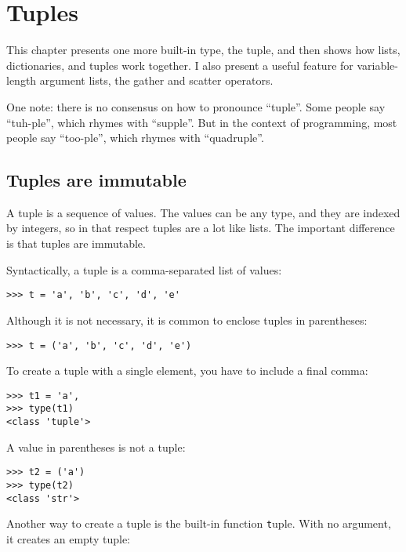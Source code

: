 \documentclass[
DIV=11,
fontsize=13,
twoside,
headinclude=false,
titlepage=firstiscover,
abstract=true,
headsepline=true,
footsepline=true,
chapterprefix=true, %
headings=big,
bibliography=totoc,%
captions=tableheading
]{scrbook}
\theoremstyle{definition}
\begin{document}
\chapter{Tuples}
\label{tuplechap}

This chapter presents one more built-in type, the tuple, and then
shows how lists, dictionaries, and tuples work together.
I also present a useful feature for variable-length argument lists,
the gather and scatter operators.

One note: there is no consensus on how to pronounce ``tuple''.
Some people say ``tuh-ple'', which rhymes with ``supple''.  But
in the context of programming, most people say ``too-ple'', which
rhymes with ``quadruple''.


\section{Tuples are immutable}

A tuple is a sequence of values.  The values can be any type, and
they are indexed by integers, so in that respect tuples are a lot
like lists.  The important difference is that tuples are immutable.

Syntactically, a tuple is a comma-separated list of values:

\begin{lstlisting}
>>> t = 'a', 'b', 'c', 'd', 'e'
\end{lstlisting}
%
Although it is not necessary, it is common to enclose tuples in
parentheses:

\begin{lstlisting}
>>> t = ('a', 'b', 'c', 'd', 'e')
\end{lstlisting}
%
To create a tuple with a single element, you have to include a final
comma:

\begin{lstlisting}
>>> t1 = 'a',
>>> type(t1)
<class 'tuple'>
\end{lstlisting}
%
A value in parentheses is not a tuple:

\begin{lstlisting}
>>> t2 = ('a')
>>> type(t2)
<class 'str'>
\end{lstlisting}
%
Another way to create a tuple is the built-in function {\texttt tuple}.
With no argument, it creates an empty tuple:
\end{document}
